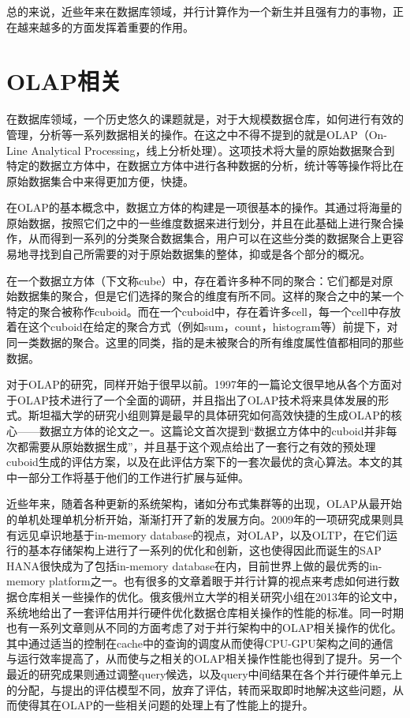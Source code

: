 总的来说，近些年来在数据库领域，并行计算作为一个新生并且强有力的事物，正在越来越多的方面发挥着重要的作用。

\section{OLAP相关}
在数据库领域，一个历史悠久的课题就是，对于大规模数据仓库，如何进行有效的管理，分析等一系列数据相关的操作。在这之中不得不提到的就是OLAP（On-Line Analytical Processing，线上分析处理）。这项技术将大量的原始数据聚合到特定的数据立方体中，在数据立方体中进行各种数据的分析，统计等等操作将比在原始数据集合中来得更加方便，快捷\cite{OLAP}。

在OLAP的基本概念中，数据立方体的构建是一项很基本的操作。其通过将海量的原始数据，按照它们之中的一些维度数据来进行划分，并且在此基础上进行聚合操作，从而得到一系列的分类聚合数据集合，用户可以在这些分类的数据聚合上更容易地寻找到自己所需要的对于原始数据集的整体，抑或是各个部分的概况。

在一个数据立方体（下文称cube）中，存在着许多种不同的聚合：它们都是对原始数据集的聚合，但是它们选择的聚合的维度有所不同。这样的聚合之中的某一个特定的聚合被称作cuboid。而在一个cuboid中，存在着许多cell，每一个cell中存放着在这个cuboid在给定的聚合方式（例如sum，count，histogram等）前提下，对同一类数据的聚合。这里的同类，指的是未被聚合的所有维度属性值都相同的那些数据。

对于OLAP的研究，同样开始于很早以前。1997年的一篇论文\cite{ChaudhuriSIGMOD1997}很早地从各个方面对于OLAP技术进行了一个全面的调研，并且指出了OLAP技术将来具体发展的形式。斯坦福大学的研究小组\cite{HarinarayanSIGMOD1996}则算是最早的具体研究如何高效快捷的生成OLAP的核心——数据立方体的论文之一。这篇论文首次提到“数据立方体中的cuboid并非每次都需要从原始数据生成”，并且基于这个观点给出了一套行之有效的预处理cuboid生成的评估方案，以及在此评估方案下的一套次最优的贪心算法。本文的其中一部分工作将基于他们的工作进行扩展与延伸。

近些年来，随着各种更新的系统架构，诸如分布式集群等的出现，OLAP从最开始的单机处理单机分析开始，渐渐打开了新的发展方向。2009年的一项研究成果\cite{PlattnerSIGMOD2009}则具有远见卓识地基于in-memory database的视点，对OLAP，以及OLTP，在它们运行的基本存储架构上进行了一系列的优化和创新，这也使得因此而诞生的SAP HANA\cite{SAPHANA}很快成为了包括in-memory database在内，目前世界上做的最优秀的in-memory platform之一。也有很多的文章着眼于并行计算的视点来考虑如何进行数据仓库相关一些操作的优化。俄亥俄州立大学的相关研究小组在2013年的论文中\cite{yuanVLDB2013}，系统地给出了一套评估用并行硬件优化数据仓库相关操作的性能的标准。同一时期也有一系列文章则从不同的方面考虑了对于并行架构中的OLAP相关操作的优化。其中\cite{heVLDB2014}通过适当的控制在cache中的查询的调度从而使得CPU-GPU架构之间的通信与运行效率提高了，从而使与之相关的OLAP相关操作性能也得到了提升。另一个最近的研究成果\cite{KarnagelVLDB2017}则通过调整query候选，以及query中间结果在各个并行硬件单元上的分配，与\cite{heACMTDS2009}提出的评估模型不同，放弃了评估，转而采取即时地解决这些问题，从而使得其在OLAP的一些相关问题的处理上有了性能上的提升。

